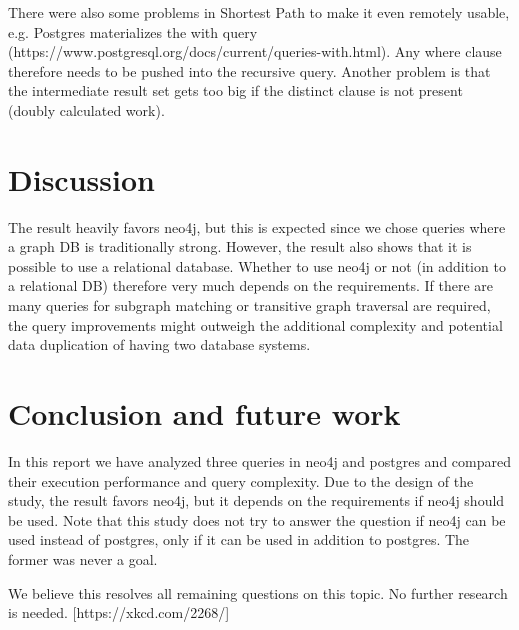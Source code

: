 \documentclass[11pt, a4paper,oneside,chapterprefix=false]{scrbook}
\begin{document}
There were also some problems in Shortest Path to make it even remotely usable, e.g. Postgres materializes the with query (https://www.postgresql.org/docs/current/queries-with.html). Any where clause therefore needs to be pushed into the recursive query.
Another problem is that the intermediate result set gets too big if the distinct clause is not present (doubly calculated work).

\chapter{Discussion} \label{chp:discussion}

The result heavily favors neo4j, but this is expected since we chose queries where a graph DB is traditionally strong.
However, the result also shows that it is possible to use a relational database.
Whether to use neo4j or not (in addition to a relational DB) therefore very much depends on the requirements.
If there are many queries for subgraph matching or transitive graph traversal are required, the query improvements might outweigh the additional complexity and potential data duplication of having two database systems.

\chapter{Conclusion and future work} \label{chp:conclusion}

In this report we have analyzed three queries in neo4j and postgres and compared their execution performance and query complexity. 
Due to the design of the study, the result favors neo4j, but it depends on the requirements if neo4j should be used.
Note that this study does not try to answer the question if neo4j can be used instead of postgres, only if it can be used in addition to postgres. The former was never a goal.

We believe this resolves all remaining questions on this topic. No further research is needed. [https://xkcd.com/2268/]




\end{document}

